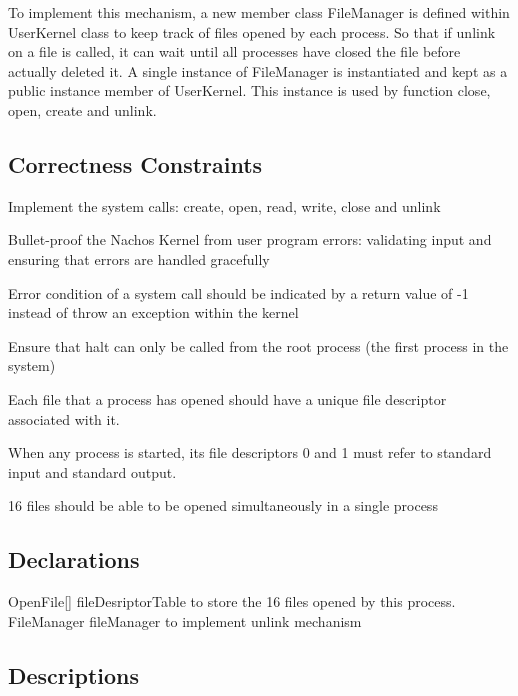 \documentclass{article}
\begin{document}
\begin{spacing}{1.1}
To implement this mechanism, a new member class \textsf{FileManager} is defined within \textsf{UserKernel} class to keep track of files opened by each process. So that if unlink on a file is called, it can wait until all processes have closed the file before actually deleted it. A single instance of FileManager is instantiated and kept as a public instance member of \textsf{UserKernel}. This instance is used by function \textsf{close}, \textsf{open}, \textsf{create} and \textsf{unlink}.



\subsection{Correctness Constraints}

\begin{asparaitem}
\item Implement the system calls: \textsf{create}, \textsf{open}, \textsf{read}, \textsf{write}, \textsf{close} and \textsf{unlink}
\item Bullet-proof the Nachos Kernel from user program errors: validating input and ensuring that errors are handled gracefully
\item Error condition of a system call should be indicated by a return value of -1 instead of throw an exception within the kernel
\item Ensure that halt can only be called from the root process (the first process in the system)
\item Each file that a process has opened should have a unique file descriptor associated with it.
\item When any process is started, its file descriptors 0 and 1 must refer to standard input and standard output.
\item 16 files should be able to be opened simultaneously in a single process
\end{asparaitem}

\subsection{Declarations}

 \textsf{OpenFile[] fileDesriptorTable} to store the 16 files opened by this process.
 \textsf{FileManager fileManager} to implement \textsf{unlink} mechanism

\subsection{Descriptions}


\end{spacing}
\end{document}
